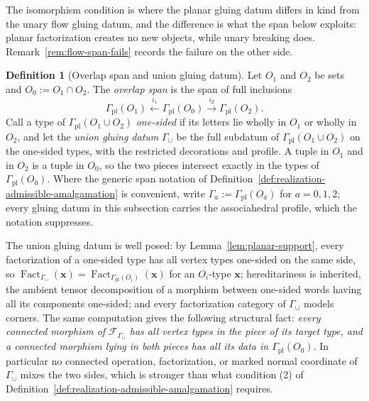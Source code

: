 \documentclass[11pt,letterpaper,twoside]{article}
\theoremstyle{plain}
\theoremstyle{definition}
\newtheorem{definition}[theorem]{Definition}
\theoremstyle{remark}
\DeclareMathOperator{\Fact}{Fact}
\begin{document}
The isomorphism condition is where the planar gluing datum differs in kind from the unary flow gluing datum, and the difference is what the span below exploits: planar factorization creates no new objects, while unary breaking does.  Remark~\ref{rem:flow-span-fails} records the failure on the other side.

\begin{definition}[Overlap span and union gluing datum]\label{def:overlap-span}
Let \(O_1\) and \(O_2\) be sets and \(O_0:=O_1\cap O_2\).  The \emph{overlap span} is the span of full inclusions
\begin{equation}\label{eq:overlap-span}
 \Gamma_{\mathrm{pl}}(O_1)
 \xleftarrow{\ i_1\ }
 \Gamma_{\mathrm{pl}}(O_0)
 \xrightarrow{\ i_2\ }
 \Gamma_{\mathrm{pl}}(O_2).
\end{equation}
Call a type of \(\Gamma_{\mathrm{pl}}(O_1\cup O_2)\) \emph{one-sided} if its letters lie wholly in \(O_1\) or wholly in \(O_2\), and let the \emph{union gluing datum} \(\Gamma_\cup\) be the full subdatum of \(\Gamma_{\mathrm{pl}}(O_1\cup O_2)\) on the one-sided types, with the restricted decorations and profile.  A tuple in \(O_1\) and in \(O_2\) is a tuple in \(O_0\), so the two pieces intersect exactly in the types of \(\Gamma_{\mathrm{pl}}(O_0)\).  Where the generic span notation of Definition~\ref{def:realization-admissible-amalgamation} is convenient, write \(\Gamma_a:=\Gamma_{\mathrm{pl}}(O_a)\) for \(a=0,1,2\); every gluing datum in this subsection carries the associahedral profile, which the notation suppresses.
\end{definition}

The union gluing datum is well posed: by Lemma~\ref{lem:planar-support}, every factorization of a one-sided type has all vertex types one-sided on the same side, so \(\Fact_{\Gamma_\cup}(\mathbf x)=\Fact_{\Gamma_{\mathrm{pl}}(O_i)}(\mathbf x)\) for an \(O_i\)-type \(\mathbf x\); hereditariness is inherited, the ambient tensor decomposition of a morphism between one-sided words having all its components one-sided; and every factorization category of \(\Gamma_\cup\) models corners.  The same computation gives the following structural fact: \emph{every connected morphism of \(\mathcal F_{\Gamma_\cup}\) has all vertex types in the piece of its target type, and a connected morphism lying in both pieces has all its data in \(\Gamma_{\mathrm{pl}}(O_0)\)}.  In particular no connected operation, factorization, or marked normal coordinate of \(\Gamma_\cup\) mixes the two sides, which is stronger than what condition (2) of Definition~\ref{def:realization-admissible-amalgamation} requires.
\end{document}
